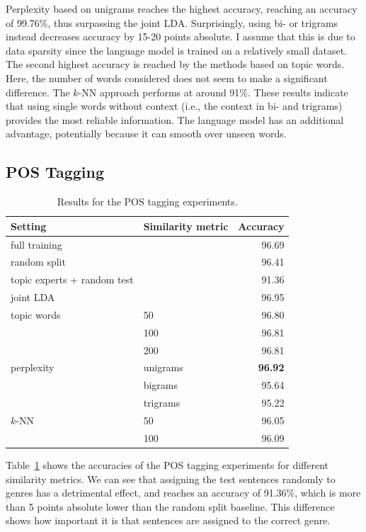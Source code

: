 Perplexity based on unigrams reaches the highest accuracy, reaching an accuracy of 99.76\%, thus surpassing the joint LDA. Surprisingly, using bi- or trigrams instead decreases accuracy by 15-20 points absolute. I assume that this is due to data sparsity since the language model is trained on a relatively small dataset. The second highest accuracy is reached by the methods based on topic words. Here, the number of words considered does not seem to make a significant difference. The $k$-NN approach performs at around 91\%. These results indicate that using single words without context (i.e., the context in bi- and trigrams) provides the most reliable information. The language model has an additional advantage, potentially because it can smooth over unseen words.
  



  
\subsection{POS Tagging}

\begin{table}[!t]
\centering
\begin{tabular}{l|l|r|}
Setting & Similarity metric & Accuracy \\ \hline
full training &  & 96.69 \\ 
random split & & 96.41 \\ 
topic experts + random test &  & 91.36 \\ \hline
joint LDA &   & 96.95 \\ \hline
topic words & 50 & 96.80 \\ 
 & 100 & 96.81 \\ 
 & 200 & 96.81 \\ \hline
perplexity & unigrams & \textbf{96.92} \\ 
 & bigrams & 95.64 \\
 & trigrams & 95.22 \\ \hline
$k$-NN & 50 & 96.05 \\  
 & 100 & 96.09 \\ \hline
\end{tabular}

\caption{Results for the POS tagging experiments.}
\label{tab:overallresultspostag}
\end{table}

Table~\ref{tab:overallresultspostag} shows the accuracies of the POS tagging experiments for different similarity metrics. We can see that assigning the test sentences randomly to genres has a detrimental effect, and reaches an accuracy of 91.36\%, which is more than 5 points absolute lower than the random split baseline. This difference shows how important it is that sentences are assigned to the correct genre.
 

